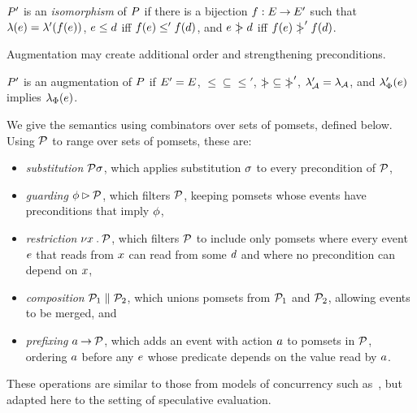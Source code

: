 \begin{definition}
  $P'$ is an \emph{isomorphism} of $P$ if there is a bijection
  $f:E\mathbin\rightarrow E'$ such that
  $\lambda(e)=\lambda'(f(e))$,
  $e\le d$ iff $f(e)\le'f(d)$, and
  $e\mathrel{\mkern4mu\mid\!\!\!>}d$ iff $f(e)\mathrel{\mkern4mu\mid\!\!\!>}'f(d)$.
\end{definition}
Augmentation may create additional order and strengthening
preconditions.
\begin{definition}
  $P'$ is an augmentation of $P$ if $E'=E$,
  ${\le}\subseteq{\le'}$, %
  ${\mathrel{\mkern4mu\mid\!\!\!>}}\subseteq{\mathrel{\mkern4mu\mid\!\!\!>}'}$, %
  $\lambda_{\mathcal{A}}'=\lambda_{\mathcal{A}}$, and %
  $\lambda_{\Phi}'(e)$ implies $\lambda_{\Phi}(e)$.
\end{definition}

We give the semantics using combinators over sets of pomsets, defined below.
Using $\mathcal{P}$ to range over sets of pomsets, these are:
\begin{itemize}
\item \emph{substitution} $\mathcal{P}\sigma$, which applies substitution $\sigma$ to
  every precondition of $\mathcal{P}$,
\item \emph{guarding} $\phi\mathbin\rhd\mathcal{P}$, which filters $\mathcal{P}$,
  keeping pomsets whose events have preconditions that imply $\phi$,
\item \emph{restriction} $\nu x\mathbin.\mathcal{P}$, which filters $\mathcal{P}$ to include
  only pomsets where every event $e$ that reads from $x$ can read from
  some $d$ and where no precondition can depend on $x$,
\item \emph{composition} $\mathcal{P}_1\parallel\mathcal{P}_2$, which unions pomsets from
  $\mathcal{P}_1$ and $\mathcal{P}_2$, allowing events to be merged, and
\item \emph{prefixing} $a\mathbin\rightarrow\mathcal{P}$, which adds an event with action
  $a$ to pomsets in $\mathcal{P}$, ordering $a$ before any $e$ whose predicate
  depends on the value read by $a$.
\end{itemize}
These operations are similar to those from models of concurrency such
as~\cite{Brookes:1984:TCS:828.833}, but adapted here to the setting of
speculative evaluation.

